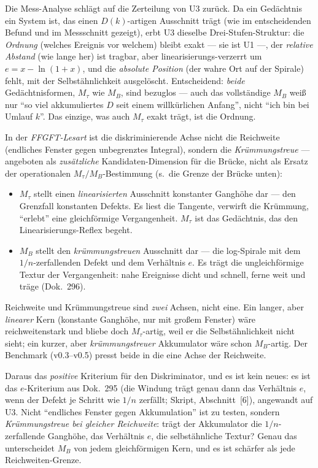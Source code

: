 Die Mess-Analyse schlägt auf die Zerteilung von U3 zurück. Da ein Gedächtnis ein System
ist, das einen $D(k)$-artigen Ausschnitt trägt (wie im entscheidenden Befund und im
Messschnitt gezeigt), erbt U3 dieselbe Drei-Stufen-Struktur: die \emph{Ordnung} (welches
Ereignis vor welchem) bleibt exakt --- sie ist U1 ---, der \emph{relative Abstand} (wie lange
her) ist tragbar, aber linearisierungs-verzerrt um $e=x-\ln(1+x)$, und die \emph{absolute
Position} (der wahre Ort auf der Spirale) fehlt, mit der Selbstähnlichkeit ausgelöscht.
Entscheidend: \emph{beide} Gedächtnisformen, $M_\tau$ wie $M_B$, sind bezuglos --- auch das
vollständige $M_B$ weiß nur \enquote{so viel akkumuliertes $D$ seit einem willkürlichen
Anfang}, nicht \enquote{ich bin bei Umlauf $k$}. Das einzige, was auch $M_\tau$ exakt trägt,
ist die Ordnung.

In der \emph{FFGFT-Lesart} ist die diskriminierende Achse nicht die Reichweite (endliches
Fenster gegen unbegrenztes Integral), sondern die \emph{Krümmungstreue} --- angeboten als
\emph{zusätzliche} Kandidaten-Dimension für die Brücke, nicht als Ersatz der operationalen
$M_\tau/M_B$-Bestimmung (s.\ die Grenze der Brücke unten):
\begin{itemize}
\item $M_\tau$ stellt einen \emph{linearisierten} Ausschnitt konstanter Ganghöhe dar --- den
Grenzfall konstanten Defekts. Es liest die Tangente, verwirft die Krümmung,
\enquote{erlebt} eine gleichförmige Vergangenheit. $M_\tau$ ist das Gedächtnis, das den
Linearisierungs-Reflex begeht.
\item $M_B$ stellt den \emph{krümmungstreuen} Ausschnitt dar --- die log-Spirale mit dem
$1/n$-zerfallenden Defekt und dem Verhältnis $e$. Es trägt die ungleichförmige Textur der
Vergangenheit: nahe Ereignisse dicht und schnell, ferne weit und träge (Dok.~296).
\end{itemize}

Reichweite und Krümmungstreue sind \emph{zwei} Achsen, nicht eine. Ein langer, aber
\emph{linearer} Kern (konstante Ganghöhe, nur mit großem Fenster) wäre reichweitenstark und
bliebe doch $M_\tau$-artig, weil er die Selbstähnlichkeit nicht sieht; ein kurzer, aber
\emph{krümmungstreuer} Akkumulator wäre schon $M_B$-artig. Der Benchmark (v0.3--v0.5) presst
beide in die eine Achse der Reichweite.

Daraus das \emph{positive} Kriterium für den Diskriminator, und es ist kein neues: es ist das
$e$-Kriterium aus Dok.~295 (die Windung trägt genau dann das Verhältnis $e$, wenn der Defekt
je Schritt wie $1/n$ zerfällt; Skript, Abschnitt~[6]), angewandt auf U3. Nicht
\enquote{endliches Fenster gegen Akkumulation} ist zu testen, sondern \emph{Krümmungstreue
bei gleicher Reichweite}: trägt der Akkumulator die $1/n$-zerfallende Ganghöhe, das
Verhältnis $e$, die selbstähnliche Textur? Genau das unterscheidet $M_B$ von jedem
gleichförmigen Kern, und es ist schärfer als jede Reichweiten-Grenze.

